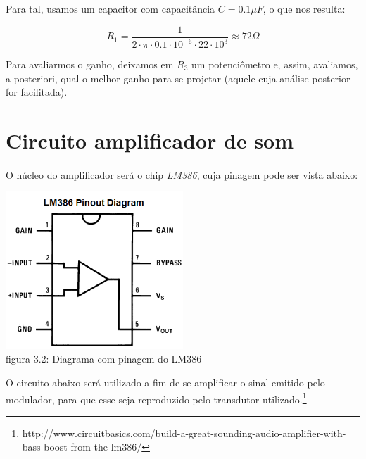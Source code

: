 \documentclass[11pt,a4paper]{report}
\begin{document}
Para tal, usamos um capacitor com capacitância $C = 0.1\mu{F}$, o que nos resulta:

\begin{equation}
R_1 = \frac{1}{2\cdot{\pi}\cdot{0.1}\cdot{10^{-6}}\cdot{22}\cdot{10^3}} \approx 72\Omega 
\end{equation}

Para avaliarmos o ganho, deixamos em $R_3$ um potenciômetro e, assim, avaliamos, a posteriori, qual o melhor ganho para se projetar (aquele cuja análise posterior for facilitada).\\

\section{Circuito amplificador de som}
\paragraph{}
O núcleo do amplificador será o chip {\it LM386}, cuja pinagem pode ser vista abaixo:\\

\begin{center}
	\includegraphics[width=0.5\textwidth]{LM386_pinout_diagram.png}\\
	\footnotesize{figura 3.2: Diagrama com pinagem do LM386}
\end{center}

O circuito abaixo será utilizado a fim de se amplificar o sinal emitido pelo modulador, para que esse seja reproduzido pelo transdutor utilizado.\footnote{http://www.circuitbasics.com/build-a-great-sounding-audio-amplifier-with-bass-boost-from-the-lm386/}\\
\end{document}
